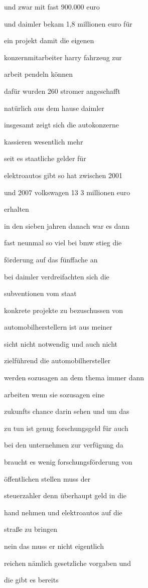 \documentclass[a4paper, 11pt]{book} %
\begin{document}
und zwar mit fast 900.000 euro

und daimler bekam 1,8 millionen euro für

ein projekt damit die eigenen

konzernmitarbeiter harry fahrzeug zur

arbeit pendeln können

dafür wurden 260 stromer angeschafft

natürlich aus dem hause daimler

insgesamt zeigt sich die autokonzerne

kassieren wesentlich mehr

seit es staatliche gelder für

elektroautos gibt so hat zwischen 2001

und 2007 volkswagen 13 3 millionen euro

erhalten

in den sieben jahren danach war es dann

fast neunmal so viel bei bmw stieg die

förderung auf das fünffache an

bei daimler verdreifachten sich die

subventionen vom staat

konkrete projekte zu bezuschussen von

automobilherstellern ist aus meiner

sicht nicht notwendig und auch nicht

zielführend die automobilhersteller

werden sozusagen an dem thema immer dann

arbeiten wenn sie sozusagen eine

zukunfts chance darin sehen und um das

zu tun ist genug forschungsgeld für auch

bei den unternehmen zur verfügung da

braucht es wenig forschungsförderung von

öffentlichen stellen muss der

steuerzahler denn überhaupt geld in die

hand nehmen und elektroautos auf die

straße zu bringen

nein das muss er nicht eigentlich

reichen nämlich gesetzliche vorgaben und

die gibt es bereits
\end{document}
